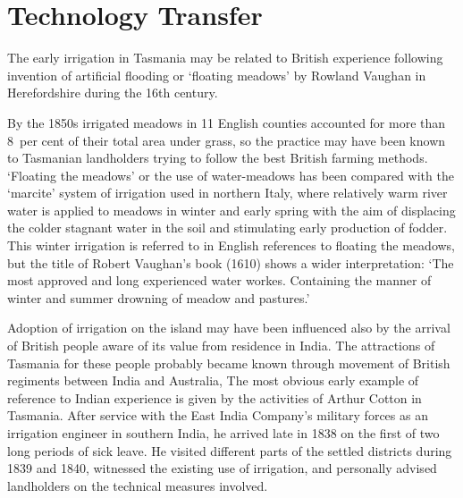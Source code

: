 \section*{Technology Transfer}

The early irrigation in Tasmania may be related to British experience
following invention of artificial flooding or `floating meadows' by
Rowland Vaughan in Herefordshire during the 16th
century.

By the 1850s irrigated meadows in 11 English counties accounted for
more than 8~per cent of their total area under grass, so the practice
may have been known to Tasmanian landholders trying to follow the best
British farming methods.  `Floating
the meadows' or the use of water-meadows has been compared with the
`marcite' system of irrigation used in northern Italy, where
relatively warm river water is applied to meadows in winter and early
spring with the aim of displacing the colder stagnant water in the
soil and stimulating early production of fodder.  This winter
irrigation is referred to in English references to floating the
meadows, but the title of Robert Vaughan's book (1610) shows a wider
interpretation: `The most approved and long experienced water workes.
Containing the manner of winter and summer drowning of meadow and
pastures.'

Adoption of irrigation on the island may have been influenced also by
the arrival of British people aware of its value from residence in
India.  The attractions of Tasmania for these people probably became
known through movement of British regiments between India and
Australia, The most obvious early example of reference to Indian
experience is given by the activities of Arthur Cotton in Tasmania.
After service with the East India Company's military forces as an
irrigation engineer in southern India, he arrived late in 1838 on the
first of two long periods of sick leave.  He visited different parts
of the settled districts during 1839 and 1840, witnessed the existing
use of irrigation, and personally advised landholders on the technical
measures involved.

